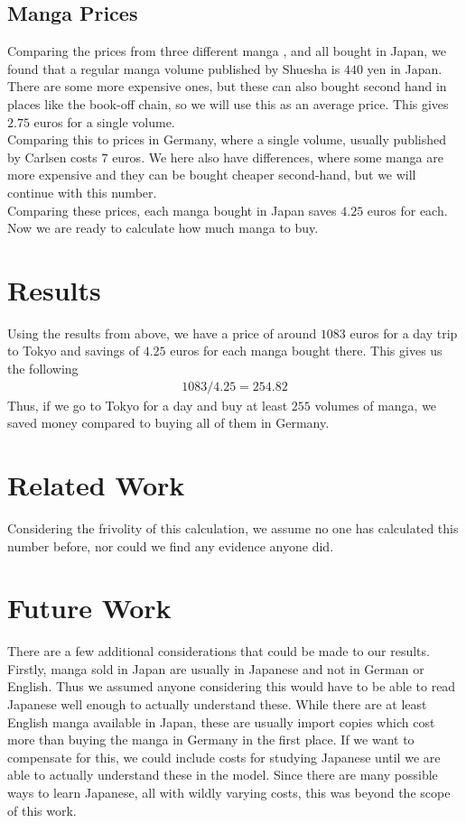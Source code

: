 \documentclass{article}
\begin{document}
\subsection{Manga Prices}
Comparing the prices from three different manga \cite{onepiece},\cite{kaguya} and \cite{chainsaw} all bought in Japan, we found that a regular manga volume published by Shuesha is $440$ yen in Japan.
There are some more expensive ones, but these can also bought second hand in places like the book-off chain, so we will use this as an average price.
This gives $2.75$ euros for a single volume.\\
Comparing this to prices in Germany, where a single volume, usually published by Carlsen costs $7$ euros.
We here also have differences, where some manga are more expensive and they can be bought cheaper second-hand, but we will continue with this number.\\
Comparing these prices, each manga bought in Japan saves $4.25$ euros for each.
Now we are ready to calculate how much manga to buy.

\section{Results}
Using the results from above, we have a price of around $1083$ euros for a day trip to Tokyo and savings of $4.25$ euros for each manga bought there.
This gives us the following 
\begin{align*}
        1083/4.25 = 254.82
\end{align*}
Thus, if we go to Tokyo for a day and buy at least $255$ volumes of manga, we saved money compared to buying all of them in Germany. 

\section{Related Work}
Considering the frivolity of this calculation, we assume no one has calculated this number before, nor could we find any evidence anyone did.

\section{Future Work}
There are a few additional considerations that could be made to our results.\\
Firstly, manga sold in Japan are usually in Japanese and not in German or English.
Thus we assumed anyone considering this would have to be able to read Japanese well enough to actually understand these.
While there are at least English manga available in Japan, these are usually import copies which cost more than buying the manga in Germany in the first place.
If we want to compensate for this, we could include costs for studying Japanese until we are able to actually understand these in the model.
Since there are many possible ways to learn Japanese, all with wildly varying costs, this was beyond the scope of this work.\\
\end{document}
